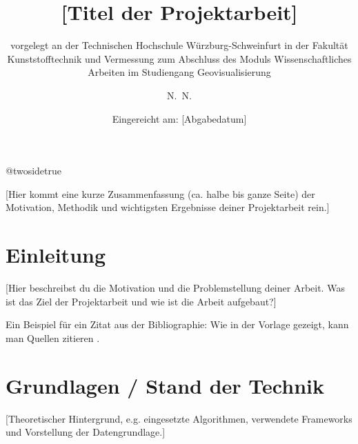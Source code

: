 \documentclass[12pt,twoside=false,a4paper,parskip]{scrbook}
\makeatletter
\def\BaAuthor{Dein Name}
\def\BaAuthorStudyProgram{Geovisualisierung}
\def\BaType{Projektarbeit}
\def\BaTitle{[Titel der Projektarbeit]}
\def\BaSupervisorOne{[Name des Erstprüfers]}
\def\BaDeadline{[Abgabedatum]}
\def\ShowBaAuthor{\BaAuthor}
\def\ShowBaAuthor{N.~N.}
\newcommand*{\forcetwosidetitle}[1][1]{%
 \begingroup
   \cleardoubleoddpage
   \KOMAoptions{titlepage=true}%
   \csname @twosidetrue\endcsname
   \maketitle[{#1}]
 \endgroup
}
\makeatother
\begin{document}


\frontmatter
\titlehead{%
  {Technische Hochschule Würzburg-Schweinfurt\\
    Fakultät Kunststofftechnik und Vermessung}}
\subject{\BaType}
\title{\BaTitle\\[15mm]}
\subtitle{\normalsize{vorgelegt an der Technischen Hochschule W\"{u}rzburg-Schweinfurt in der Fakult\"{a}t Kunststofftechnik und Vermessung zum Abschluss des Moduls Wissenschaftliches Arbeiten im Studiengang \BaAuthorStudyProgram}}
\author{\ShowBaAuthor}
\date{\normalsize{Eingereicht am: \BaDeadline}}
\publishers{
  \normalsize{Erstprüfer: \BaSupervisorOne}\\
}

\forcetwosidetitle




[Hier kommt eine kurze Zusammenfassung (ca. halbe bis ganze Seite) der Motivation, Methodik und wichtigsten Ergebnisse deiner Projektarbeit rein.]


\tableofcontents



\mainmatter


\chapter{Einleitung} \label{sec:einleitung}

[Hier beschreibst du die Motivation und die Problemstellung deiner Arbeit. Was ist das Ziel der Projektarbeit und wie ist die Arbeit aufgebaut?]

Ein Beispiel für ein Zitat aus der Bibliographie: Wie in der Vorlage gezeigt, kann man Quellen zitieren \cite{billiMetricErrorAssessment2025}.


\chapter{Grundlagen / Stand der Technik} \label{sec:grundlagen}

[Theoretischer Hintergrund, e.g. eingesetzte Algorithmen, verwendete Frameworks und Vorstellung der Datengrundlage.]
\end{document}
